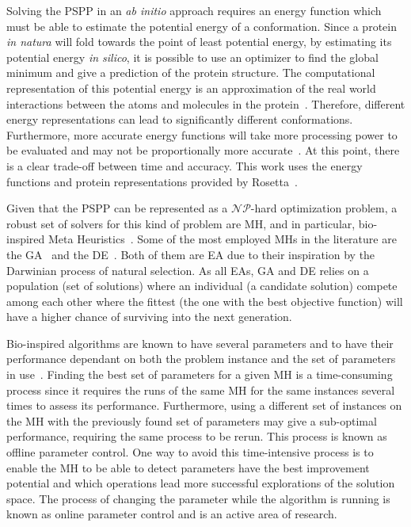Solving the \ac{PSPP} in an \textit{ab initio} approach requires an energy function
which must be able to estimate the potential energy of a conformation. Since a
protein \textit{in natura} will fold towards the point of least potential
energy, by estimating its potential energy \textit{in silico}, it is possible to
use an optimizer to find the global minimum and give a prediction of the
protein structure. The computational representation of this potential energy is
an approximation of the real world interactions between the atoms and molecules
in the protein~\cite{alford2017rosetta}. Therefore,
different energy representations can lead to
significantly different conformations. Furthermore, more accurate energy
functions will take more processing power to be evaluated and may not be
proportionally more accurate~\cite{xu2012ab}. At this point,
there is a clear trade-off between time and accuracy.
This work uses the energy functions and protein representations provided by
Rosetta~\cite{rohl2004protein,leaver2011rosetta3}.

Given that the \ac{PSPP} can be represented as a $\mathcal{NP}$-hard optimization
problem, a robust set of solvers for this kind of problem are
\ac{MH}, and in particular, bio-inspired Meta Heuristics~\cite{kar2016bio}.
Some of the most employed \ac{MH}s in the literature are the
\ac{GA}~\cite{holland1992genetic} and the
\ac{DE}~\cite{storn1997differential}. Both of them are
\ac{EA} due to their inspiration by the Darwinian process of natural
selection. As all \ac{EA}s, \ac{GA} and \ac{DE} relies on a population
(set of solutions) where an
individual (a candidate solution) compete among each other where the fittest (the one
with the best objective function) will have a higher chance of surviving into
the next generation.

Bio-inspired algorithms are known to have several parameters and to have their
performance dependant on both the problem instance and the set of parameters in
use~\cite{parpinelli18review}.
Finding the best set of parameters for a given \ac{MH} is a time-consuming
process since it requires the runs of the same \ac{MH} for the same instances
several times to assess its performance. Furthermore, using a different set of
instances on the \ac{MH} with the previously found set of parameters may give a
sub-optimal performance, requiring the same process to be rerun.  This process
is known as offline parameter control. One way to avoid this time-intensive
process is to enable the \ac{MH} to be able to detect parameters have the best
improvement potential and which operations lead more successful explorations of
the solution space. The process of changing the parameter while the algorithm
is running is known as online parameter control and is an active area of
research.

